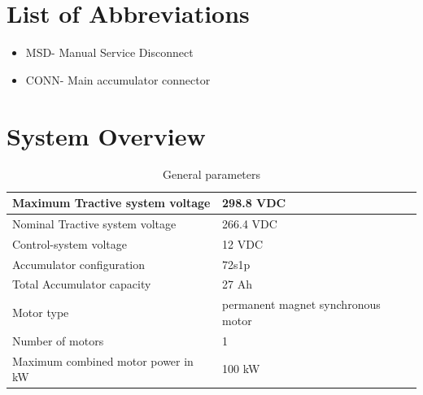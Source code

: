 \documentclass{article}
\begin{document}
\tableofcontents
{}

\newpage
\listoffigures
{}

\newpage
\listoftables
{}

\newpage
\section*{List of Abbreviations}
\begin{itemize}
    \item MSD- Manual Service Disconnect
    \item CONN- Main accumulator connector
\end{itemize}

\setlength{\parindent}{0pt}

\newpage
{}

\section{System Overview}

	\begin{table}[H]
        \centering
        \begin{tabular}{|l|l|}
        \hline
            Maximum Tractive system voltage & 298.8 VDC \\ \hline
            Nominal Tractive system voltage & 266.4 VDC \\ \hline
            Control-system voltage & 12 VDC \\ \hline
            Accumulator configuration & 72s1p \\ \hline
            Total Accumulator capacity & 27 Ah \\ \hline
            Motor type & permanent magnet synchronous motor \\ \hline
            Number of motors & 1 \\ \hline
            Maximum combined motor power in kW & 100 kW \\ \hline
        \end{tabular}
        \caption{General parameters}
        \label{systemtable}
    \end{table}
\end{document}
